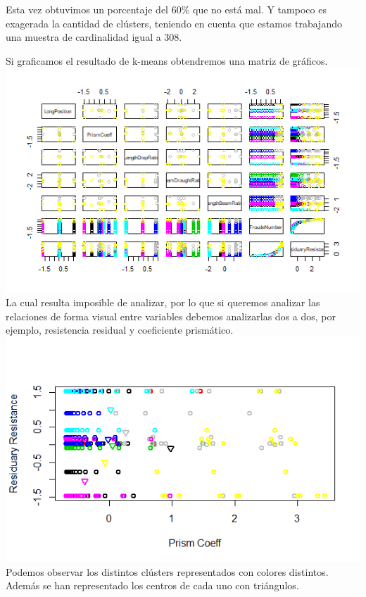 \documentclass[twoside]{article}
\begin{document}
\begin{multicols}{2}
Esta vez obtuvimos un porcentaje del $60\%$ que no est\'a mal. Y tampoco es exagerada la cantidad de cl\'usters, teniendo en cuenta que estamos trabajando una muestra de cardinalidad igual a $308$.

Si graficamos el resultado de k-means obtendremos una matriz de gr\'aficos.\\

\includegraphics[scale=0.5]{images/pic_34.png} \\

La cual resulta imposible de analizar, por lo que si queremos analizar las relaciones de forma visual entre variables debemos analizarlas dos a dos, por ejemplo, resistencia residual y coeficiente prism\'atico.\\

\includegraphics[scale=0.5]{images/pic_35.png} \\

Podemos observar los distintos cl\'usters representados con colores distintos. Adem\'as se han representado los centros de cada uno con tri\'angulos.



\end{multicols}
\end{document}
